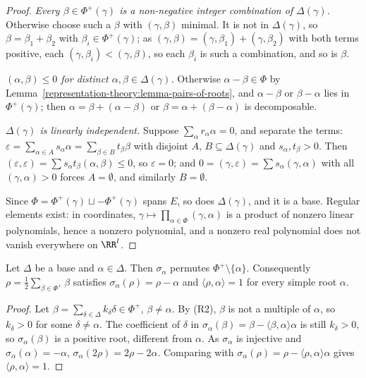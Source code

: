 \begin{proof}
\emph{Every $\beta \in \Phi^+(\gamma)$ is a non-negative integer combination of $\Delta(\gamma)$.} Otherwise choose such a $\beta$ with $(\gamma, \beta)$ minimal. It is not in
$\Delta(\gamma)$, so $\beta = \beta_1 + \beta_2$ with $\beta_i \in \Phi^+(\gamma)$; as $(\gamma, \beta) = (\gamma, \beta_1) + (\gamma, \beta_2)$ with both terms positive, each
$(\gamma, \beta_i) < (\gamma, \beta)$, so each $\beta_i$ is such a combination, and so is $\beta$.

\emph{$(\alpha, \beta) \leq 0$ for distinct $\alpha, \beta \in \Delta(\gamma)$.} Otherwise $\alpha - \beta \in \Phi$ by Lemma~\ref{representation-theory:lemma-pairs-of-roots}, and
$\alpha - \beta$ or $\beta - \alpha$ lies in $\Phi^+(\gamma)$; then $\alpha = \beta + (\alpha - \beta)$ or $\beta = \alpha + (\beta - \alpha)$ is decomposable.

\emph{$\Delta(\gamma)$ is linearly independent.} Suppose $\sum_\alpha r_\alpha\alpha = 0$, and separate the terms: $\varepsilon = \sum_{\alpha \in A}s_\alpha\alpha = \sum_{\beta \in B}t_\beta\beta$
with disjoint $A$, $B \subseteq \Delta(\gamma)$ and $s_\alpha, t_\beta > 0$. Then $(\varepsilon, \varepsilon) = \sum s_\alpha t_\beta(\alpha, \beta) \leq 0$, so $\varepsilon = 0$; and
$0 = (\gamma, \varepsilon) = \sum s_\alpha(\gamma, \alpha)$ with all $(\gamma, \alpha) > 0$ forces $A = \emptyset$, and similarly $B = \emptyset$.

Since $\Phi = \Phi^+(\gamma) \sqcup -\Phi^+(\gamma)$ spans $E$, so does $\Delta(\gamma)$, and it is a base. Regular elements exist: in coordinates, $\gamma \mapsto
\prod_{\alpha \in \Phi}(\gamma, \alpha)$ is a product of nonzero linear polynomials, hence a nonzero polynomial, and a nonzero real polynomial does not vanish everywhere on $\RR^l$.
\end{proof}

\begin{lemma}\label{representation-theory:lemma-simple-reflection}
Let $\Delta$ be a base and $\alpha \in \Delta$. Then $\sigma_\alpha$ permutes $\Phi^+ \setminus \{\alpha\}$. Consequently $\rho = \frac12\sum_{\beta \in \Phi^+}\beta$ satisfies
$\sigma_\alpha(\rho) = \rho - \alpha$ and $\langle\rho, \alpha\rangle = 1$ for every simple root $\alpha$.
\end{lemma}

\begin{proof}
Let $\beta = \sum_{\delta \in \Delta}k_\delta\delta \in \Phi^+$, $\beta \neq \alpha$. By (R2), $\beta$ is not a multiple of $\alpha$, so $k_\delta > 0$ for some $\delta \neq \alpha$. The
coefficient of $\delta$ in $\sigma_\alpha(\beta) = \beta - \langle\beta, \alpha\rangle\alpha$ is still $k_\delta > 0$, so $\sigma_\alpha(\beta)$ is a positive root, different from $\alpha$.
As $\sigma_\alpha$ is injective and $\sigma_\alpha(\alpha) = -\alpha$, $\sigma_\alpha(2\rho) = 2\rho - 2\alpha$. Comparing with $\sigma_\alpha(\rho) = \rho - \langle\rho, \alpha\rangle\alpha$
gives $\langle\rho, \alpha\rangle = 1$.
\end{proof}

